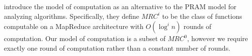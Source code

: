 \documentclass[../main.tex]{subfiles}
\begin{document}
\cite{karloff2010model} introduce the  model of computation as an alternative to the PRAM model for analyzing algorithms.
Specifically, they define $MRC^i$ to be the class of functions computable on a MapReduce architecture with $O(\log^i n)$ rounds of computation.
Our model of computation is a subset of $MRC^0$,
however we require exactly one round of computation rather than a constant number of rounds.

\end{document}

